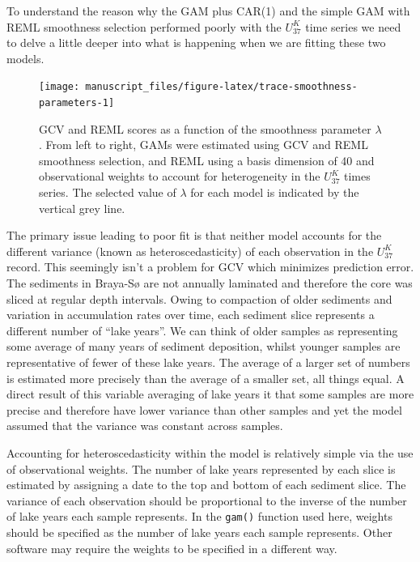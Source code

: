 \documentclass[12pt,]{article}
\newcommand{\uk}{\ensuremath{\mathit{U}^{\mathit{K}}_{\mathup{37}}}}
\begin{document}
To understand the reason why the GAM plus CAR(1) and the simple GAM with
REML smoothness selection performed poorly with the \uk{} time series we
need to delve a little deeper into what is happening when we are fitting
these two models.

\begin{figure}

{\centering \texttt{[image: manuscript\_files/figure-latex/trace-smoothness-parameters-1]} 

}

\caption{GCV and REML scores as a function of the smoothness parameter $\lambda$. From left to right, GAMs were estimated using GCV and REML smoothness selection, and REML using a basis dimension of 40 and observational weights to account for heterogeneity in the \uk{} times series. The selected value of $\lambda$ for each model is indicated by the vertical grey line.}\label{fig:trace-smoothness-parameters}
\end{figure}

The primary issue leading to poor fit is that neither model accounts for
the different variance (known as heteroscedasticity) of each observation
in the \uk{} record. This seemingly isn't a problem for GCV which
minimizes prediction error. The sediments in Braya-Sø are not annually
laminated and therefore the core was sliced at regular depth intervals.
Owing to compaction of older sediments and variation in accumulation
rates over time, each sediment slice represents a different number of
``lake years''. We can think of older samples as representing some
average of many years of sediment deposition, whilst younger samples are
representative of fewer of these lake years. The average of a larger set
of numbers is estimated more precisely than the average of a smaller
set, all things equal. A direct result of this variable averaging of
lake years it that some samples are more precise and therefore have
lower variance than other samples and yet the model assumed that the
variance was constant across samples.

Accounting for heteroscedasticity within the model is relatively simple
via the use of observational weights. The number of lake years
represented by each slice is estimated by assigning a date to the top
and bottom of each sediment slice. The variance of each observation
should be proportional to the inverse of the number of lake years each
sample represents. In the \texttt{gam()} function used here, weights
should be specified as the number of lake years each sample represents.
Other software may require the weights to be specified in a different
way.
\end{document}
